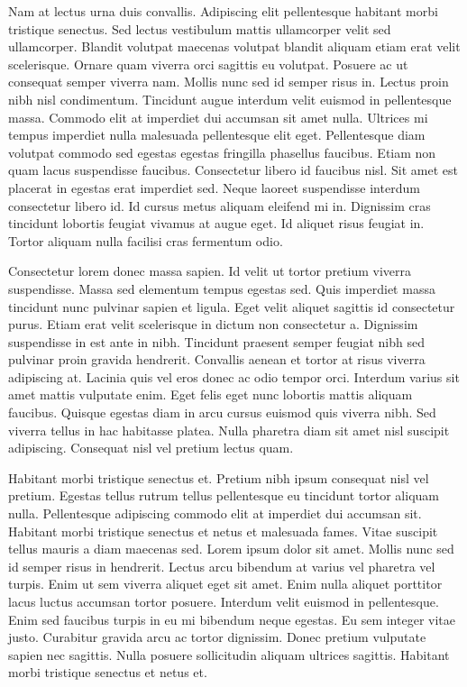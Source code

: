 \documentclass[11pt,a4paper]{article}
\begin{document}
Nam at lectus urna duis convallis. Adipiscing elit pellentesque habitant morbi tristique senectus. Sed lectus vestibulum mattis ullamcorper velit sed ullamcorper. Blandit volutpat maecenas volutpat blandit aliquam etiam erat velit scelerisque. Ornare quam viverra orci sagittis eu volutpat. Posuere ac ut consequat semper viverra nam. Mollis nunc sed id semper risus in. Lectus proin nibh nisl condimentum. Tincidunt augue interdum velit euismod in pellentesque massa. Commodo elit at imperdiet dui accumsan sit amet nulla. Ultrices mi tempus imperdiet nulla malesuada pellentesque elit eget. Pellentesque diam volutpat commodo sed egestas egestas fringilla phasellus faucibus. Etiam non quam lacus suspendisse faucibus. Consectetur libero id faucibus nisl. Sit amet est placerat in egestas erat imperdiet sed. Neque laoreet suspendisse interdum consectetur libero id. Id cursus metus aliquam eleifend mi in. Dignissim cras tincidunt lobortis feugiat vivamus at augue eget. Id aliquet risus feugiat in. Tortor aliquam nulla facilisi cras fermentum odio.

Consectetur lorem donec massa sapien. Id velit ut tortor pretium viverra suspendisse. Massa sed elementum tempus egestas sed. Quis imperdiet massa tincidunt nunc pulvinar sapien et ligula. Eget velit aliquet sagittis id consectetur purus. Etiam erat velit scelerisque in dictum non consectetur a. Dignissim suspendisse in est ante in nibh. Tincidunt praesent semper feugiat nibh sed pulvinar proin gravida hendrerit. Convallis aenean et tortor at risus viverra adipiscing at. Lacinia quis vel eros donec ac odio tempor orci. Interdum varius sit amet mattis vulputate enim. Eget felis eget nunc lobortis mattis aliquam faucibus. Quisque egestas diam in arcu cursus euismod quis viverra nibh. Sed viverra tellus in hac habitasse platea. Nulla pharetra diam sit amet nisl suscipit adipiscing. Consequat nisl vel pretium lectus quam.

Habitant morbi tristique senectus et. Pretium nibh ipsum consequat nisl vel pretium. Egestas tellus rutrum tellus pellentesque eu tincidunt tortor aliquam nulla. Pellentesque adipiscing commodo elit at imperdiet dui accumsan sit. Habitant morbi tristique senectus et netus et malesuada fames. Vitae suscipit tellus mauris a diam maecenas sed. Lorem ipsum dolor sit amet. Mollis nunc sed id semper risus in hendrerit. Lectus arcu bibendum at varius vel pharetra vel turpis. Enim ut sem viverra aliquet eget sit amet. Enim nulla aliquet porttitor lacus luctus accumsan tortor posuere. Interdum velit euismod in pellentesque. Enim sed faucibus turpis in eu mi bibendum neque egestas. Eu sem integer vitae justo. Curabitur gravida arcu ac tortor dignissim. Donec pretium vulputate sapien nec sagittis. Nulla posuere sollicitudin aliquam ultrices sagittis. Habitant morbi tristique senectus et netus et.
\end{document}
